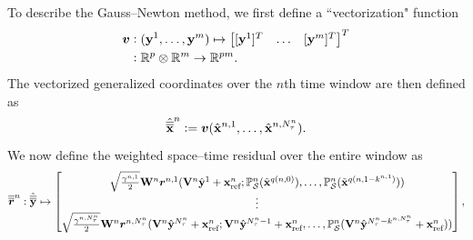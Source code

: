 To describe the Gauss--Newton method, we first define a ``vectorization" function 
\begin{align*}
 \boldsymbol v &\vcentcolon (\mathbf{y}^{1},\ldots,\mathbf{y}^{m} ) \mapsto \begin{bmatrix} [\mathbf{y}^{1}]^T & \ldots & [\mathbf{y}^{m}]^T \end{bmatrix}^T  \\
&\vcentcolon \mathbb{R}^{p} \otimes \mathbb{R}^{m} \rightarrow \mathbb{R}^{pm}.
\end{align*}
The vectorized generalized coordinates over the $n$th time window are then
defined as 
\begin{equation*}
\hat{\overline{\overline{\mathbf {x}}}}^{n} \vcentcolon= 
\boldsymbol v (\hat{\mathbf{x}}^{n,1},\ldots,\hat{\mathbf{x}}^{n,N_{\tau}^{n}} ).
\end{equation*}
We now define the weighted space--time residual over the entire window as
\begin{equation*}
\overline{\overline{\boldsymbol r}}^{n}_{\text{}} : \hat{\overline{\overline{\mathbf{y}}}}^{} \mapsto \begin{bmatrix}
 \sqrt{\frac{\gamma^{n,1}}{2}} \mathbf{W}^{n} \boldsymbol r_{}^{n,1}( \mathbf {V}^{n} \hat{\mathbf{y}}^{1} + \mathbf{x}_\text{ref}^{n}; 
\mathbb{P}_{\mathcal{S}}^{n}( \tilde{\mathbf{x}}^{q(n,0)}),
\ldots , \mathbb{P}_{\mathcal{S}}^{n}( \tilde{\mathbf{x}}^{q(n,1 - k^{n,1}) } )  ) \\
\vdots \\
 \sqrt{\frac{\gamma^{n,N_{\tau}^{n}}}{2}} \mathbf{W}^{n} \boldsymbol r_{}^{n,N_{\tau}^{n}}( \mathbf {V}^{n} \hat{\mathbf{y}}^{N_{\tau}^{n}} + \mathbf{x}_\text{ref}^{n}; \mathbf {V}^{n} \hat{\mathbf{y}}^{N_{\tau}^{n}-1} + \mathbf{x}_\text{ref}^{n} ,  \ldots,\mathbb{P}_{\mathcal{S}}^{n}( \mathbf {V}^{n} \hat{\mathbf{y}}^{N_{\tau}^{n} - k^{n,N_{\tau}^{n}} } + \mathbf{x}_\text{ref}^{n} )) \\
\end{bmatrix},
\end{equation*}
